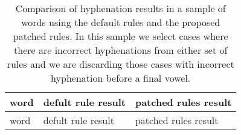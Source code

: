 % 
% 
\begin{small}
\begin{longtable}{l l l}
    \caption{Comparison of hyphenation results in a sample of words using the default rules and the proposed patched rules. In this sample we select cases where there are incorrect hyphenations from either set of rules and we are discarding those cases with incorrect hyphenation before a final vowel.}\label{tab-resultados}\\
\hline
word & defult rule result & patched rules result \\
\hline
\endfirsthead
\hline
word & defult rule result & patched rules result \\
\hline
\endhead

\end{longtable}
\end{small}

